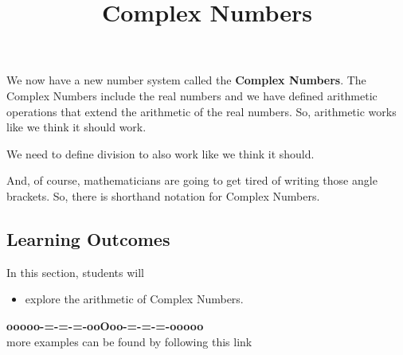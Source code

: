\documentclass{ximera}
\title{Complex Numbers}
\begin{document}
\begin{abstract}
\end{abstract}
\maketitle







We now have a new number system called the \textbf{Complex Numbers}.  The Complex Numbers include the real numbers and we have defined arithmetic operations that extend the arithmetic of the real numbers.  So, arithmetic works like we think it should work.

We need to define division to also work like we think it should.  


And, of course, mathematicians are going to get tired of writing those angle brackets.  So, there is shorthand notation for Complex Numbers.





\subsection*{Learning Outcomes}

\begin{sectionOutcomes}
In this section, students will 

\begin{itemize}
\item explore the arithmetic of Complex Numbers.
\end{itemize}
\end{sectionOutcomes}










\begin{center}
\textbf{\textcolor{green!50!black}{ooooo-=-=-=-ooOoo-=-=-=-ooooo}} \\

more examples can be found by following this link\\ 

\end{center}
\end{document}
